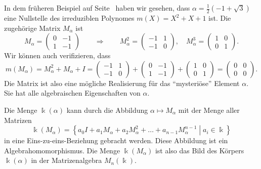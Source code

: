 \begin{beispiel}
In dem früheren Beispiel auf
Seite~\pageref{buch:endliche-koerper:eqn:1iwurzel3}
haben wir gesehen, dass
$\alpha=\frac12(-1+\sqrt{3})$ 
eine Nullstelle des irreduziblen Polynomes $m(X)=X^2+X+1$ ist.
Die zugehörige Matrix $M_\alpha$ ist
\[
M_{\alpha}
=
\begin{pmatrix}
0&-1\\
1&-1
\end{pmatrix}
\qquad\Rightarrow\qquad
M_{\alpha}^2
=
\begin{pmatrix}
-1& 1\\
-1& 0
\end{pmatrix},\quad
M_{\alpha}^3
=
\begin{pmatrix}
 1& 0\\
 0& 1
\end{pmatrix}.
\]
Wir können auch verifizieren, dass
\[
m(M_\alpha)
=
M_\alpha^2+M_\alpha+I
=
\begin{pmatrix}
-1& 1\\
-1& 0
\end{pmatrix}
+
\begin{pmatrix}
0&-1\\
1&-1
\end{pmatrix}
+
\begin{pmatrix}
1&0\\
0&1
\end{pmatrix}
=
\begin{pmatrix}
0&0\\
0&0
\end{pmatrix}.
\]
Die Matrix ist also eine mögliche Realisierung für das ``mysteriöse''
Element $\alpha$.
Sie hat alle algebraischen Eigenschaften von $\alpha$.
\end{beispiel}

Die Menge $\Bbbk(\alpha)$ kann durch die Abbildung $\alpha\mapsto M_\alpha$
mit der Menge aller Matrizen
\[
\Bbbk(M_\alpha)
=
\left\{
\left.
a_0I+a_1M_\alpha+a_2M_\alpha^2+\dots+a_{n-1}M_\alpha^{n-1}\;\right|\; a_i\in\Bbbk
\right\}
\]
in eine Eins-zu-eins-Beziehung gebracht werden.
Diese Abbildung ist ein Algebrahomomorphismus.
Die Menge $\Bbbk(M_\alpha)$ ist also das Bild des
Körpers $\Bbbk(\alpha)$ in der Matrizenalgebra $M_n(\Bbbk)$.

